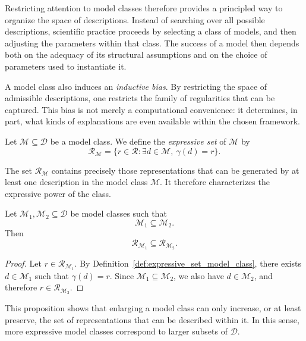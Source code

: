 Restricting attention to model classes therefore provides a principled way to organize the space of descriptions. Instead of searching over all possible descriptions, scientific practice proceeds by selecting a class of models, and then adjusting the parameters within that class. The success of a model then depends both on the adequacy of its structural assumptions and on the choice of parameters used to instantiate it.

A model class also induces an \emph{inductive bias}. By restricting the space of admissible descriptions, one restricts the family of regularities that can be captured. This bias is not merely a computational convenience: it determines, in part, what kinds of explanations are even available within the chosen framework.

\begin{definition}
\label{def:expressive_set_model_class}
Let $\mathcal{M} \subseteq \mathcal{D}$ be a model class. We define the \emph{expressive set} of $\mathcal{M}$ by
\[
\mathcal{R}_{\mathcal{M}} = \{ r \in \mathcal{R} : \exists d \in \mathcal{M},\ \gamma(d)=r \}.
\]
\end{definition}

The set $\mathcal{R}_{\mathcal{M}}$ contains precisely those representations that can be generated by at least one description in the model class $\mathcal{M}$. It therefore characterizes the expressive power of the class.

\begin{proposition}
\label{prop:model_class_inclusion}
Let $\mathcal{M}_1, \mathcal{M}_2 \subseteq \mathcal{D}$ be model classes such that
\[
\mathcal{M}_1 \subseteq \mathcal{M}_2.
\]
Then
\[
\mathcal{R}_{\mathcal{M}_1} \subseteq \mathcal{R}_{\mathcal{M}_2}.
\]
\end{proposition}

\begin{proof}
Let $r \in \mathcal{R}_{\mathcal{M}_1}$. By Definition~\ref{def:expressive_set_model_class}, there exists $d \in \mathcal{M}_1$ such that $\gamma(d)=r$. Since $\mathcal{M}_1 \subseteq \mathcal{M}_2$, we also have $d \in \mathcal{M}_2$, and therefore $r \in \mathcal{R}_{\mathcal{M}_2}$.
\end{proof}

This proposition shows that enlarging a model class can only increase, or at least preserve, the set of representations that can be described within it. In this sense, more expressive model classes correspond to larger subsets of \(\mathcal{D}\).

